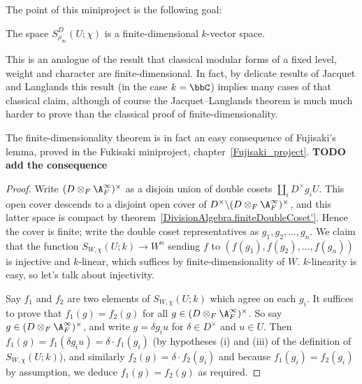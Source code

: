 The point of this miniproject is the following goal:

\begin{theorem}
  \label{TotallyDefiniteQuaternionAlgebra.AutomorphicForm.finiteDimensional}
  The space $S_{\rho_\infty}^D(U;\chi)$ is a finite-dimensional $k$-vector space.
\end{theorem}

This is an analogue of the result that classical modular forms of a fixed
level, weight and character are finite-dimensional. In fact, by delicate results
of Jacquet and Langlands this result (in the case $k=\bbC$) implies many cases of that classical claim,
although of course the Jacquet--Langlands theorem is much much harder to prove than the classical
proof of finite-dimensionality.

The finite-dimensionality theorem is in fact an easy consequence of Fujisaki's lemma,
proved in the Fukisaki miniproject, chapter~\ref{Fujisaki_project}. {\bf TODO add the
consequence}

\begin{proof}
  Write $(D\otimes_F\A_F^\infty)^\times$ as a disjoin union of double cosets
  $\coprod_i D^\times g_i U$. This open cover descends to a disjoint open
  cover of $D^\times\backslash (D\otimes_F\A_F^\infty)^\times$,
  and this latter space is compact by theorem~\ref{DivisionAlgebra.finiteDoubleCoset'}.
  Hence the cover is finite; write the double coset representatives
  as $g_1,g_2,\ldots,g_n$. We claim that
  the function $S_{W,\chi}(U;k)\to W^n$ sending $f$ to $(f(g_1),f(g_2),\ldots,f(g_n))$
  is injective and $k$-linear, which suffices by finite-dimensionality of $W$.
  $k$-linearity is easy, so let's talk about injectivity.

  Say $f_1$ and $f_2$ are two elements of $S_{W,\chi}(U;k)$ which agree on
  each $g_i$. It suffices to prove that $f_1(g)=f_2(g)$ for all
  $g\in(D\otimes_F\A_F^\infty)^\times$. So say $g\in(D\otimes_F\A_F^\infty)^\times$,
  and write $g=\delta g_iu$ for $\delta \in D^\times$ and $u\in U$.
  Then $f_1(g)=f_1(\delta g_iu)=\delta\cdot f_1(g_i)$ (by hypotheses (i) and (iii)
  of the definition of $S_{W,\chi}(U;k)$), and similarly $f_2(g)=\delta\cdot f_2(g_i)$
  and because $f_1(g_i)=f_2(g_i)$ by assumption, we deduce $f_1(g)=f_2(g)$ as required.
\end{proof}

